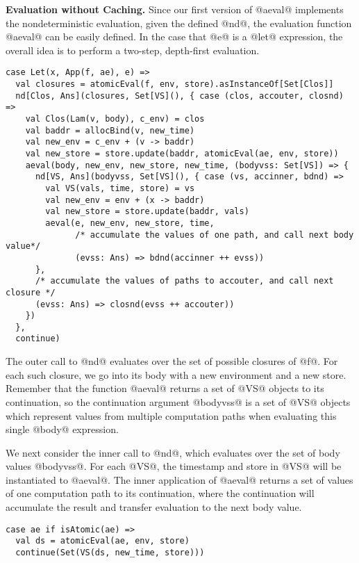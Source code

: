 \documentclass[acmsmall,review,anonymous]{acmart}\settopmatter{printfolios=true,printccs=false,printacmref=false}
\begin{document}
\textbf{Evaluation without Caching.}
Since our first version of @aeval@ implements the nondeterministic
evaluation, given the defined @nd@, the evaluation function @aeval@ can be easily
defined. In the case that @e@ is a @let@ expression,
the overall idea is to perform a two-step, depth-first evaluation. 

\begin{lstlisting}
case Let(x, App(f, ae), e) =>
  val closures = atomicEval(f, env, store).asInstanceOf[Set[Clos]]
  nd[Clos, Ans](closures, Set[VS](), { case (clos, accouter, closnd) =>
    val Clos(Lam(v, body), c_env) = clos
    val baddr = allocBind(v, new_time)
    val new_env = c_env + (v -> baddr)
    val new_store = store.update(baddr, atomicEval(ae, env, store))
    aeval(body, new_env, new_store, new_time, (bodyvss: Set[VS]) => {
      nd[VS, Ans](bodyvss, Set[VS](), { case (vs, accinner, bdnd) =>
        val VS(vals, time, store) = vs
        val new_env = env + (x -> baddr)
        val new_store = store.update(baddr, vals)
        aeval(e, new_env, new_store, time,
              /* accumulate the values of one path, and call next body value*/
              (evss: Ans) => bdnd(accinner ++ evss))
      },
      /* accumulate the values of paths to accouter, and call next closure */
      (evss: Ans) => closnd(evss ++ accouter))
    })
  },
  continue)
\end{lstlisting}

The outer call to @nd@ evaluates over the set of possible closures of
@f@. For each such closure, we go into its body with a new environment and a new store.
Remember that the function @aeval@ returns a set of @VS@ objects to its continuation,
so the continuation argument @bodyvss@ is a set of @VS@ objects which represent values
from multiple computation paths when evaluating this single @body@ expression.

We next consider the inner call to @nd@, which evaluates over the set of body values @bodyvss@.
For each @VS@, the timestamp and store in @VS@ will be instantiated to
@aeval@.
The inner application of @aeval@ returns a set of values of one computation path to its
continuation, where the continuation will accumulate the result and transfer
evaluation to the next body value.

\begin{lstlisting}
case ae if isAtomic(ae) =>
  val ds = atomicEval(ae, env, store)
  continue(Set(VS(ds, new_time, store)))
\end{lstlisting}
\end{document}
